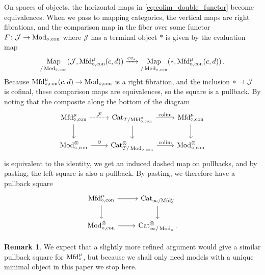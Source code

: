 \documentclass[10pt]{amsart}
\numberwithin{equation}{section}
\theoremstyle{definition}
\newtheorem{rem}[prop]{Remark}
\DeclareMathOperator{\Map}{Map}
\DeclareMathOperator{\Mod}{Mod}
\DeclareMathOperator{\con}{con}
\DeclareMathOperator*{\colim}{colim}
\newcommand{\Cat}{\mathrm{Cat}\vphantom{t}}
\newcommand{\Mfd}{\mathrm{Mfd}\vphantom{d}}
\newcommand{\cJ}{\mathcal{J}}
\newcommand{\cF}{\mathcal{F}}
\newcommand{\del}{\partial}
\renewcommand{\to}{\mathchoice{\longrightarrow}{\rightarrow}{}{}}
\begin{document}
On spaces of objects, the horizontal maps in \eqref{eq:colim_double_functor} become equivalences. When we pass to mapping categories, the vertical maps are right fibrations, and the comparison map in the fiber over some functor $F\colon \cJ \to \Mod_{\diamond,\con}$ where $\cJ$ has a terminal object $\ast$ is given by the evaluation map
\begin{align*}
	\Map_{/\Mod_{\diamond,\con}}(\cJ, \Mfd^{\mu}_{\diamond,\con}(c,d)) \xrightarrow{ev_{\ast}} \Map_{/\Mod_{\diamond,\con}}(\ast, \Mfd_{\diamond,\con}^{\mu}(c,d)) \,.
\end{align*}
Because $\Mfd_{\diamond,\con}^{\mu}(c,d) \to \Mod_{\diamond,\con}$ is a right fibration, and the inclusion $\ast \to \cJ$ is cofinal, these comparison maps are equivalences, so the square is a pullback.
By noting that the composite along the bottom of the
diagram
\begin{equation*}
	\begin{tikzcd}
		\Mfd_{\diamond,\con}^{\mu} \arrow[r, dashed, "\cF"] \arrow[d]      &   \Cat_{T/\Mfd_{\diamond, \con}^{\mu} }  \arrow[d]  \arrow[r, "\colim"] & \Mfd_{\diamond,\con}^{\mu} \arrow[d] \\
		\Mod_{\diamond,\con}^{\otimes}  \arrow[r,"\del"]               &   \Cat_{T/\Mod_{\diamond,\con}}^{\otimes}  \arrow[r, "\colim"]            & \Mod_{\diamond,\con}^{\otimes}
	\end{tikzcd}
\end{equation*}
is equivalent to the identity, we get an induced dashed map on pullbacks, and by pasting, the left square is also a pullback.
By pasting, we therefore have a pullback square
\begin{equation*}\label{eq:canonical presheaf}
	\begin{tikzcd}
		\Mfd^{\mu}_{\diamond,\con} \arrow[r] \arrow[d]      &   \Cat_{\infty/\Mfd_{\diamond}^{\mu}}  \arrow[d] \\
		\Mod_{\diamond,\con}^{\otimes}  \arrow[r]               & \Cat_{\infty/\Mod_{\diamond}}^{\otimes} \,.
	\end{tikzcd}
\end{equation*}

\begin{rem}
	We expect that a slightly more refined argument would give a similar pullback square for $\Mfd^{\mu}_{\diamond}$, but because we shall only need models with a unique minimal object in this paper we stop here.
\end{rem}
\end{document}
